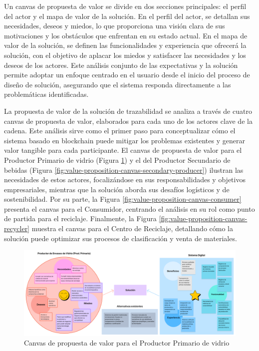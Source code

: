 Un canvas de propuesta de valor se divide en dos secciones principales: el perfil del actor y el mapa de valor de la solución. En el perfil del actor, se detallan sus necesidades, deseos y miedos, lo que proporciona una visión clara de sus motivaciones y los obstáculos que enfrentan en su estado actual. En el mapa de valor de la solución, se definen las funcionalidades y experiencia que ofrecerá la solución, con el objetivo de aplacar los miedos y satisfacer las necesidades y los deseos de los actores. Este análisis conjunto de las expectativas y la solución permite adoptar un enfoque centrado en el usuario desde el inicio del proceso de diseño de solución, asegurando que el sistema responda directamente a las problemáticas identificadas.

La propuesta de valor de la solución de trazabilidad se analiza a través de cuatro canvas de propuesta de valor, elaborados para cada uno de los actores clave de la cadena. Este análisis sirve como el primer paso para conceptualizar cómo el sistema basado en blockchain puede mitigar los problemas existentes y generar valor tangible para cada participante. El canvas de propuesta de valor para el Productor Primario de vidrio (Figura \ref{fig:value-proposition-canvas-primary-producer}) y el del Productor Secundario de bebidas (Figura \ref{fig:value-proposition-canvas-secondary-producer}) ilustran las necesidades de estos actores, focalizándose en sus responsabilidades y objetivos empresariales, mientras que la solución aborda sus desafíos logísticos y de \gls{sostenibilidad}. Por su parte, la Figura \ref{fig:value-proposition-canvas-consumer} presenta el canvas para el Consumidor, centrando el análisis en su rol como punto de partida para el reciclaje. Finalmente, la Figura \ref{fig:value-proposition-canvas-recycler} muestra el canvas para el Centro de Reciclaje, detallando cómo la solución puede optimizar sus procesos de clasificación y venta de materiales.

\begin{figure}[!htb]
    \centering
    \includegraphics[width=\textwidth]{Figures/value-proposition-canvas-primary-producer.png}
    \caption{Canvas de propuesta de valor para el Productor Primario de vidrio}
    \label{fig:value-proposition-canvas-primary-producer}
\end{figure}

